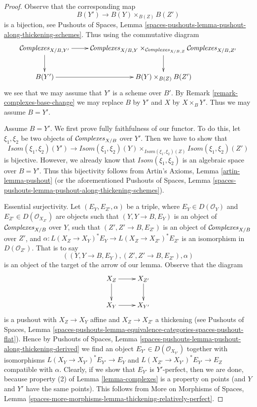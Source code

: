 \begin{proof}
Observe that the corresponding map
$$
B(Y') \longrightarrow B(Y) \times_{B(Z)} B(Z')
$$
is a bijection, see Pushouts of Spaces, Lemma
\ref{spaces-pushouts-lemma-pushout-along-thickening-schemes}.
Thus using the commutative diagram
$$
\xymatrix{
\Complexesstack_{X/B, Y'} \ar[r] \ar[d] &
\Complexesstack_{X/B, Y}
\times_{\Complexesstack_{X/B, Z}}
\Complexesstack_{X/B, Z'}
\ar[d] \\
B(Y') \ar[r] & B(Y) \times_{B(Z)} B(Z')
}
$$
we see that we may assume that $Y'$ is a scheme over $B'$. By
Remark \ref{remark-complexes-base-change}
we may replace $B$ by $Y'$ and $X$ by $X \times_B Y'$.
Thus we may assume $B = Y'$.

\medskip\noindent
Assume $B = Y'$. We first prove fully faithfulness of our functor.
To do this, let $\xi_1, \xi_2$ be two objects of $\mathcal{C}\!\mathit{omplexes}_{X/B}$
over $Y'$. Then we have to show that
$$
\mathit{Isom}(\xi_1, \xi_2)(Y') \longrightarrow
\mathit{Isom}(\xi_1, \xi_2)(Y)
\times_{\mathit{Isom}(\xi_1, \xi_2)(Z)}
\mathit{Isom}(\xi_1, \xi_2)(Z')
$$
is bijective. However, we already know that $\mathit{Isom}(\xi_1, \xi_2)$
is an algebraic space over $B = Y'$. Thus this bijectivity follows from
Artin's Axioms, Lemma \ref{artin-lemma-pushout} (or the aforementioned
Pushouts of Spaces, Lemma
\ref{spaces-pushouts-lemma-pushout-along-thickening-schemes}).

\medskip\noindent
Essential surjectivity. Let $(E_Y, E_{Z'}, \alpha)$ be a triple,
where $E_Y \in D(\mathcal{O}_Y)$ and $E_{Z'} \in D(\mathcal{O}_{X_{Z'}})$
are objects such that $(Y, Y \to B, E_Y)$ is an object of
$\mathcal{C}\!\mathit{omplexes}_{X/B}$ over $Y$, such that
$(Z', Z' \to B, E_{Z'})$ is an object of $\mathcal{C}\!\mathit{omplexes}_{X/B}$ over $Z'$,
and $\alpha : L(X_Z \to X_Y)^*E_Y \to L(X_Z \to X_{Z'})^*E_{Z'}$
is an isomorphism in $D(\mathcal{O}_{Z'})$.
That is to say
$$
((Y, Y \to B, E_Y), (Z', Z' \to B, E_{Z'}), \alpha)
$$
is an object of the target of the arrow of our lemma.
Observe that the diagram
$$
\xymatrix{
X_Z \ar[r] \ar[d] & X_{Z'} \ar[d] \\
X_Y \ar[r] & X_{Y'}
}
$$
is a pushout with $X_Z \to X_Y$ affine and $X_Z \to X_{Z'}$ a thickening
(see Pushouts of Spaces, Lemma
\ref{spaces-pushouts-lemma-equivalence-categories-spaces-pushout-flat}).
Hence by Pushouts of Spaces, Lemma
\ref{spaces-pushouts-lemma-pushout-along-thickening-derived}
we find an object $E_{Y'} \in D(\mathcal{O}_{X_{Y'}})$
together with isomorphisms
$L(X_Y \to X_{Y'})^*E_{Y'} \to E_Y$ and
$L(X_{Z'} \to X_{Y'})^*E_{Y'} \to E_Z$
compatible with $\alpha$. Clearly, if we show that
$E_{Y'}$ is $Y'$-perfect, then we are done, because property (2)
of Lemma \ref{lemma-complexes}
is a property on points (and $Y$ and $Y'$ have the same points).
This follows from More on Morphisms of Spaces, Lemma
\ref{spaces-more-morphisms-lemma-thickening-relatively-perfect}.
\end{proof}

